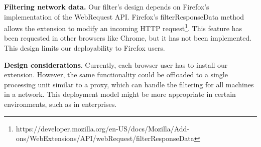 
\textbf{Filtering network data.} Our filter's design depends
on Firefox's implementation of the WebRequest API.
Firefox's filterResponseData method allows the extension to modify an incoming
HTTP request\footnote{https://developer.mozilla.org/en-US/docs/Mozilla/Add-ons/WebExtensions/API/webRequest/filterResponseData}.
This feature has been requested in other browsers like
Chrome, but it has not been implemented. This design limits our deployability to Firefox users.


\textbf{Design considerations}. Currently, each browser user has to install our extension. However, the same functionality could be offloaded to a single processing unit similar to a proxy, which can handle the filtering for all machines in a network. This deployment model might be more appropriate in certain environments, such as in enterprises.



